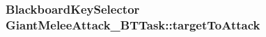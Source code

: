 \subsubsection[{\texorpdfstring{target\+To\+Attack}{targetToAttack}}]{\setlength{\rightskip}{0pt plus 5cm}Blackboard\+Key\+Selector Giant\+Melee\+Attack\+\_\+\+B\+T\+Task\+::target\+To\+Attack}\hypertarget{class_giant_melee_attack___b_t_task_ace477d8d2d2c02e1ae5220e36e60b6ac}{}\label{class_giant_melee_attack___b_t_task_ace477d8d2d2c02e1ae5220e36e60b6ac}
